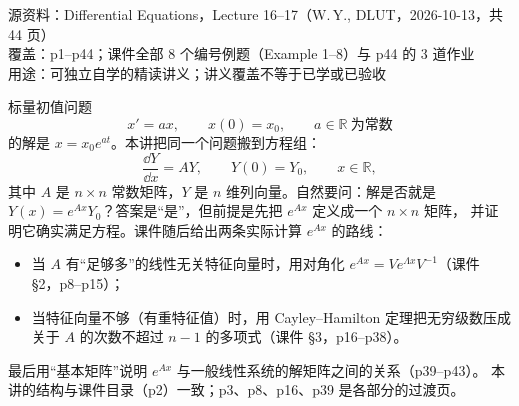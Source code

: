 \documentclass[11pt]{ctexart}
\newcommand{\R}{\mathbb{R}}
\begin{document}
%
{源资料：Differential Equations，Lecture 16--17（W.\,Y., DLUT，2026-10-13，共 44 页）\\
覆盖：p1--p44；课件全部 8 个编号例题（Example 1--8）与 p44 的 3 道作业\\
用途：可独立自学的精读讲义；讲义覆盖不等于已学或已验收}

\flowerrule



标量初值问题
\[
x'=ax,\qquad x(0)=x_0,\qquad a\in\R\ \text{为常数}
\]
的解是 $x=x_0e^{at}$。本讲把同一个问题搬到方程组：
\begin{equation}\label{eq:system}
\frac{\dd Y}{\dd x}=AY,\qquad Y(0)=Y_0,\qquad x\in\R,
\end{equation}
其中 $A$ 是 $n\times n$ 常数矩阵，$Y$ 是 $n$ 维列向量。自然要问：解是否就是
$Y(x)=e^{Ax}Y_0$？答案是“是”，但前提是先把 $e^{Ax}$ 定义成一个 $n\times n$ 矩阵，
并证明它确实满足方程。课件随后给出两条实际计算 $e^{Ax}$ 的路线：
\begin{itemize}
  \item 当 $A$ 有“足够多”的线性无关特征向量时，用对角化
        $e^{Ax}=Ve^{\Lambda x}V^{-1}$（课件 §2，p8--p15）；
  \item 当特征向量不够（有重特征值）时，用 Cayley--Hamilton 定理把无穷级数压成
        关于 $A$ 的次数不超过 $n-1$ 的多项式（课件 §3，p16--p38）。
\end{itemize}
最后用“基本矩阵”说明 $e^{Ax}$ 与一般线性系统的解矩阵之间的关系（p39--p43）。
本讲的结构与课件目录（p2）一致；p3、p8、p16、p39 是各部分的过渡页。

\clearpage
{}
\end{document}
